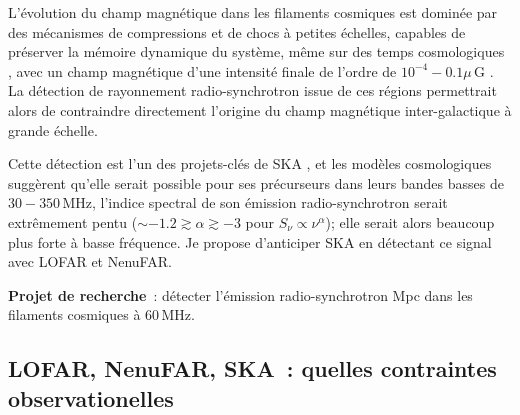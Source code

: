 \pg
L'\'evolution du champ magn\'etique dans les filaments cosmiques est domin\'ee par des m\'ecanismes de compressions et de chocs \`a petites \'echelles, capables de pr\'eserver la m\'emoire dynamique du syst\`eme, m\^eme sur des temps cosmologiques \cite{2008Sci...320..909R, 2016arXiv160207526V}, avec un champ magn\'etique d'une intensit\'e finale de l'ordre de $10^{-4} - 0.1 \mu$\,G \cite{1999A&A...348..351D, 2005ApJ...631L..21B, 2003PhRvD..68d3002S, 2008Sci...320..909R, 2009ApJ...698L..14X, 2009MNRAS.392.1008D,2015MNRAS.453.3999M}. La d\'etection de rayonnement radio-synchrotron issue de ces r\'egions permettrait alors de contraindre directement l'origine du champ magn\'etique inter-galactique \`a grande \'echelle.

\pg
Cette d\'etection est l'un des projets-cl\'es de SKA \cite{2020Galax...8...53H}, et les mod\`eles cosmologiques sugg\`erent qu'elle serait possible pour ses pr\'ecurseurs \cite{2015A&A...580A.119V} dans leurs bandes basses de $30-350$\,MHz, l'indice spectral de son \'emission radio-synchrotron serait extr\^emement pentu ($\sim -1.2 \gtrsim \alpha  \gtrsim -3$ pour $S_\nu \propto \nu^\alpha$); elle serait alors beaucoup plus forte \`a basse fr\'equence. Je propose d'anticiper SKA en d\'etectant ce signal avec LOFAR et NenuFAR.%

\begin{tcolorbox}[colback=green!10, colframe=green!50!black, arc=3mm, boxrule=1pt]
	\textbf{Projet de recherche}~: d\'etecter l'\'emission radio-synchrotron Mpc dans les filaments cosmiques \`a 60\,MHz. 
\end{tcolorbox}

\subsection{LOFAR, NenuFAR, SKA~: quelles contraintes observationelles}

